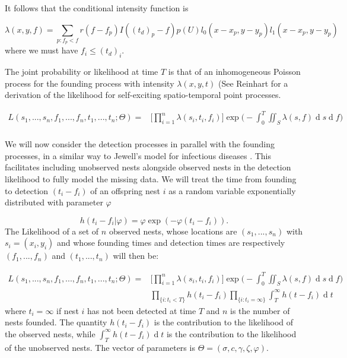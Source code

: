 \documentclass{article}
\renewcommand{\d}[1]{\ensuremath{\operatorname{d}\!{#1}}}
\begin{document}
It follows that the conditional intensity function is

\begin{equation*}
    \lambda(x, y, f) = \sum_{p:f_p < f} r(f - f_p) I((t_d)_p - f) p(U) l_0(x - x_p, y - y_p) l_1(x - x_p, y - y_p)
\end{equation*}
where we must have $f_i\leq (t_d)_i$.

The joint probability or likelihood at time $T$ is that of an inhomogeneous Poisson process for the founding process with intensity $\lambda(x, y, t)$ (See Reinhart \cite{Reinhart} for a derivation of the likelihood for self-exciting spatio-temporal point processes.

\begin{equation*} \label{eq:like}
    \begin{aligned}
        L(s_{1}, ..., s_{n}, f_{1}, ..., f_{n}, t_{1}, ..., t_{n} ; \Theta) = & \Bigg[ \prod_{i = 1}^{n} \lambda(s_{i}, t_{i}, f_{i}) \Bigg] \exp \Bigg(- \int_{0}^{T} \iint_{S} \lambda(s, f) \d s \d f \Bigg) \\
    \end{aligned}
\end{equation*}

We will now consider the detection processes in parallel with the founding processes, in a similar way to Jewell's model for infectious diseases \cite{Jewell}. This facilitates including unobserved nests alongside observed nests in the detection likelihood to fully model the missing data. We will treat the time from founding to detection $(t_i - f_i)$ of an offspring nest $i$ as a random variable exponentially distributed with parameter $\varphi$

\begin{equation*}
    h(t_{i} - f_{i} | \varphi) = \varphi \exp (- \varphi(t_{i} - f_{i})).
\end{equation*}
The Likelihood of a set of $n$ observed nests, whose locations are $(s_{1}, ... , s_{n})$ with $s_i = (x_i, y_i)$ and whose founding times and detection times are respectively $(f_{1}, ... , f_{n})$ and $(t_{1},  ... , t_{n})$ will then be:

\begin{equation} \label{eq:like}
    \begin{aligned}
        L(s_{1}, ..., s_{n}, f_{1}, ..., f_{n}, t_{1}, ..., t_{n} ; \Theta) = & \Bigg[ \prod_{i = 1}^{n} \lambda(s_{i}, t_{i}, f_{i}) \Bigg] \exp \Bigg(- \int_{0}^{T} \iint_{S} \lambda(s, f) \d s \d f \Bigg) \\ 
        & \prod_{\{ i : t_{i} < T \} } h(t_{i} - f_{i}) \prod_{ \{ i : t_{i} = \infty \} } \int_{T}^{\infty} h(t - f_{i}) \d t
    \end{aligned}
\end{equation}
where $t_{i} = \infty$ if nest $i$ has not been detected at time $T$ and $n$ is the number of nests founded. The quantity $h(t_{i} - f_{i})$ is the contribution to the likelihood of the observed nests, while $\int_{T}^{\infty} h(t - f_{i}) \d t$ is the contribution to the likelihood of the unobserved nests. The vector of parameters is $\Theta = ( \sigma, c, \gamma, \zeta, \varphi)$.
\end{document}

